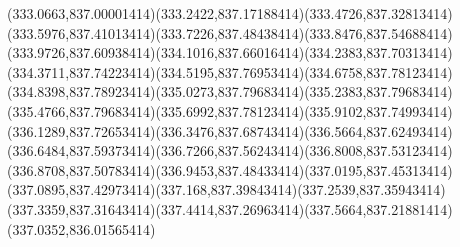 {{	\curveto(333.0663,837.00001414)(333.2422,837.17188414)(333.4726,837.32813414)
	\curveto(333.5976,837.41013414)(333.7226,837.48438414)(333.8476,837.54688414)
	\curveto(333.9726,837.60938414)(334.1016,837.66016414)(334.2383,837.70313414)
	\curveto(334.3711,837.74223414)(334.5195,837.76953414)(334.6758,837.78123414)
	\curveto(334.8398,837.78923414)(335.0273,837.79683414)(335.2383,837.79683414)
	\curveto(335.4766,837.79683414)(335.6992,837.78123414)(335.9102,837.74993414)
	\curveto(336.1289,837.72653414)(336.3476,837.68743414)(336.5664,837.62493414)
	\curveto(336.6484,837.59373414)(336.7266,837.56243414)(336.8008,837.53123414)
	\curveto(336.8708,837.50783414)(336.9453,837.48433414)(337.0195,837.45313414)
	\curveto(337.0895,837.42973414)(337.168,837.39843414)(337.2539,837.35943414)
	\curveto(337.3359,837.31643414)(337.4414,837.26963414)(337.5664,837.21881414)
	\closepath
	\moveto(337.0352,836.01565414)
}
}

{
}

{
}

{
}

